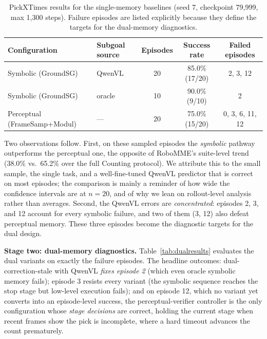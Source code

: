 \documentclass{article}
\begin{document}
\begin{table}[t]
  \centering
  \caption{PickXTimes results for the single-memory baselines (seed 7, checkpoint 79{,}999, max 1{,}300 steps). Failure episodes are listed explicitly because they define the targets for the dual-memory diagnostics.}
  \label{tab:results}
  \small
  \setlength{\tabcolsep}{4pt}
  \begin{tabular}{llccc}
    \toprule
    Configuration & Subgoal source & Episodes & Success rate & Failed episodes \\
    \midrule
    Symbolic (GroundSG) & QwenVL & 20 & 85.0\% (17/20) & 2, 3, 12 \\
    Symbolic (GroundSG) & oracle & 10 & 90.0\% (9/10) & 2 \\
    Perceptual (FrameSamp+Modul) & --- & 20 & 75.0\% (15/20) & 0, 3, 6, 11, 12 \\
    \bottomrule
  \end{tabular}
\end{table}

Two observations follow. First, on these sampled episodes the \emph{symbolic} pathway outperforms the perceptual one, the opposite of RoboMME's suite-level trend (38.0\% vs.\ 65.2\% over the full Counting protocol). We attribute this to the small sample, the single task, and a well-fine-tuned QwenVL predictor that is correct on most episodes; the comparison is mainly a reminder of how wide the confidence intervals are at $n{=}20$, and of why we lean on rollout-level analysis rather than averages. Second, the QwenVL errors are \emph{concentrated}: episodes 2, 3, and 12 account for every symbolic failure, and two of them (3, 12) also defeat perceptual memory. These three episodes become the diagnostic targets for the dual design.

\textbf{Stage two: dual-memory diagnostics.} Table~\ref{tab:dualresults} evaluates the dual variants on exactly the failure episodes. The headline outcomes: dual-correction-stale with QwenVL \emph{fixes episode 2} (which even oracle symbolic memory fails); episode 3 resists every variant (the symbolic sequence reaches the stop stage but low-level execution fails); and on episode 12, which no variant yet converts into an episode-level success, the perceptual-verifier controller is the only configuration whose \emph{stage decisions} are correct, holding the current stage when recent frames show the pick is incomplete, where a hard timeout advances the count prematurely.
\end{document}
